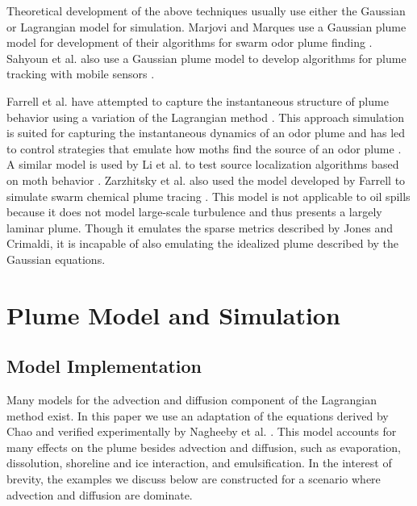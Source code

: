 \documentclass[ letterpaper, 10 pt, conference]{ieeeconf}  %
\begin{document}
Theoretical development of the above techniques usually use either the Gaussian or Lagrangian model for simulation.   Marjovi and Marques use a Gaussian plume model for development of their algorithms for swarm odor plume finding \cite{Marjovi2014}.  Sahyoun et al. also use a Gaussian plume model to develop algorithms for plume tracking with mobile sensors \cite{Sahyoun2010}.  

Farrell et al. have attempted to capture the instantaneous structure of plume behavior using a variation of the Lagrangian method \cite{Farrell2002} \cite{Farrell2003}.  This approach simulation is suited for capturing the instantaneous dynamics of an odor plume and has led to control strategies that emulate how moths find the source of an odor plume \cite{Farrell2002}.  A similar model is used by Li et al. to test source localization algorithms based on moth behavior \cite{Farrell2003} \cite{Li2006}.  Zarzhitsky et al. also used the model developed by Farrell to simulate swarm chemical plume tracing \cite{Farrell2002}\cite{Zarzhitsky2005} .  This model is not applicable to oil spills because it does not model large-scale turbulence and thus presents a largely laminar plume.  Though it emulates the sparse metrics described by Jones and Crimaldi, it is incapable of also emulating the idealized plume described by the Gaussian equations.


\section{Plume Model and Simulation} \label{part:implementation}
\subsection{Model Implementation}
Many models for the advection and diffusion component of the Lagrangian method exist.   In this paper we use an adaptation of the equations derived by Chao and verified experimentally by Nagheeby et al. \cite{Chao2003} \cite{Nagheeby2010}.   This model accounts for many effects on the plume besides advection and diffusion, such as evaporation, dissolution, shoreline and ice interaction,  and emulsification.  In the interest of brevity, the examples we discuss below are constructed for a scenario where advection and diffusion are dominate.


\end{document}
